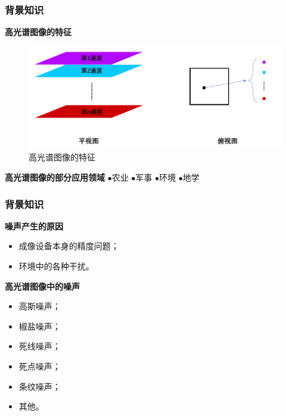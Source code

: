 \documentclass[10pt,aspectratio=43,mathserif]{beamer}
\begin{document}
\begin{frame}
\frametitle{\textbf{背景知识}}
\begin{block}{\textbf{高光谱图像的特征}}
\begin{figure}[H]
\centering
\includegraphics[scale=0.5]{img-characterofphotograph.png}
\caption{高光谱图像的特征}
\end{figure}
\end{block}
    	
\begin{block}{\textbf{高光谱图像的部分应用领域}}
$\bullet$农业 \qquad 
$\bullet$军事 \qquad 
$\bullet$环境 \qquad 
$\bullet$地学
\end{block}
\end{frame}

\begin{frame}
\frametitle{\textbf{背景知识}}
\begin{block}{\textbf{噪声产生的原因}}
\begin{itemize}
\item 成像设备本身的精度问题；
\item 环境中的各种干扰。
\end{itemize}
\end{block}

\begin{block}{\textbf{高光谱图像中的噪声}}
\begin{itemize}
\item 高斯噪声；
\item 椒盐噪声；
\item 死线噪声；
\item 死点噪声；
\item 条纹噪声；
\item 其他。
\end{itemize}
\end{block}
\end{frame}

%
\end{document}
